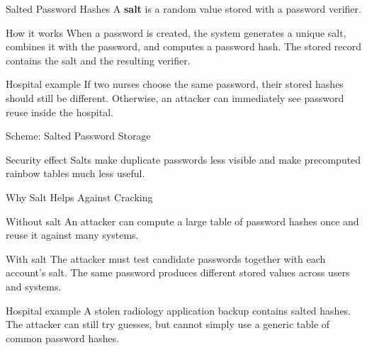 \documentclass[presentation]{beamer}
\begin{document}
\begin{frame}[c]{Salted Password Hashes}
  A \textbf{salt} is a random value stored with a password verifier.

  \begin{block}{How it works}
    When a password is created, the system generates a unique salt, combines it with the password, and computes a password hash. The stored record contains the salt and the resulting verifier.
  \end{block}

  \begin{exampleblock}{Hospital example}
    If two nurses choose the same password, their stored hashes should still be different. Otherwise, an attacker can immediately see password reuse inside the hospital.
  \end{exampleblock}
\end{frame}

\begin{frame}[c]{Scheme: Salted Password Storage}
  \begin{center}
  \end{center}

  \vspace{0.45cm}
  \begin{block}{Security effect}
    Salts make duplicate passwords less visible and make precomputed rainbow tables much less useful.
  \end{block}
\end{frame}

\begin{frame}[c]{Why Salt Helps Against Cracking}
  \begin{block}{Without salt}
    An attacker can compute a large table of password hashes once and reuse it against many systems.
  \end{block}

  \begin{block}{With salt}
    The attacker must test candidate passwords together with each account's salt. The same password produces different stored values across users and systems.
  \end{block}

  \begin{exampleblock}{Hospital example}
    A stolen radiology application backup contains salted hashes. The attacker can still try guesses, but cannot simply use a generic table of common password hashes.
  \end{exampleblock}
\end{frame}
\end{document}
